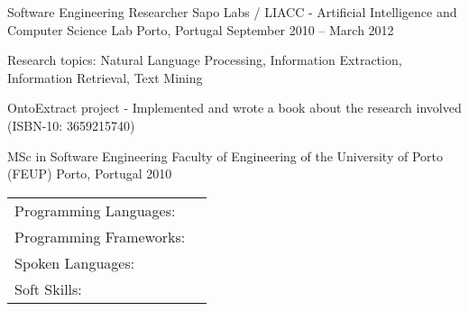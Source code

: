 \documentclass[]{awesome-cv}
\begin{document}
\begin{cventries}
	\vspace{-4mm}
	\cventry
	{Software Engineering Researcher}
	{Sapo Labs / LIACC - Artificial Intelligence and Computer Science Lab}
	{Porto, Portugal}
	{September 2010 – March 2012}
	{\begin{cvitems}
		\item {Research topics: Natural Language Processing, Information Extraction, Information Retrieval, Text Mining}
		\item {OntoExtract project - Implemented and wrote a book about the research involved (ISBN-10: 3659215740)}
		\end{cvitems}}
\end{cventries}
\vspace{-5mm}
\begin{cventries}
	\cventry
	{MSc in Software Engineering}
	{Faculty of Engineering of the University of Porto (FEUP)}
	{Porto, Portugal}
	{2010}
	{}
\end{cventries}

\vspace{-6mm}
\begin{cventries}
	\vspace{-2mm}
	\cventry
	{}
	{\def\arraystretch{1.15}{\begin{tabular}{ l l }
		Programming Languages:  & {\skill{ Kotlin, Java, JavaScript, Perl, SQL, PHP, C++}} \\
		Programming Frameworks:  & {\skill{ Android, ionic, jQuery, Laravel, Vue.js, Quasar, Play Framework}} \\
		Spoken Languages:  & {\skill{ English, Portuguese, French, Spanish, Slovene}} \\
		Soft Skills:  & {\skill{ Ability to Work Under Pressure, Self-motivation, Creativity, Good communication}} \\
		\end{tabular}}}
	{}
	{}
	{}
\end{cventries}
\end{document}
